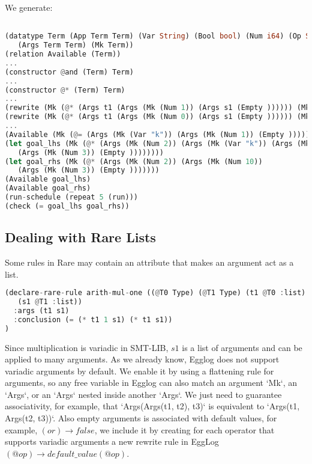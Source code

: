 \documentclass{article}
\begin{document}
We generate:
\begin{lstlisting}[language=Rust]

(datatype Term (App Term Term) (Var String) (Bool bool) (Num i64) (Op String) (Empty)
   (Args Term Term) (Mk Term))
(relation Available (Term))
...
(constructor @and (Term) Term)
...
(constructor @* (Term) Term)
...
(rewrite (Mk (@* (Args t1 (Args (Mk (Num 1)) (Args s1 (Empty )))))) (Mk (@* (Args t1 (Args s1 (Empty ))))))
(rewrite (Mk (@* (Args t1 (Args (Mk (Num 0)) (Args s1 (Empty )))))) (Mk (Num 0)))
...
(Available (Mk (@= (Args (Mk (Var "k")) (Args (Mk (Num 1)) (Empty ))))))
(let goal_lhs (Mk (@* (Args (Mk (Num 2)) (Args (Mk (Var "k")) (Args (Mk (Num 10)) 
   (Args (Mk (Num 3)) (Empty ))))))))
(let goal_rhs (Mk (@* (Args (Mk (Num 2)) (Args (Mk (Num 10))
   (Args (Mk (Num 3)) (Empty )))))))
(Available goal_lhs)
(Available goal_rhs)
(run-schedule (repeat 5 (run)))
(check (= goal_lhs goal_rhs))
\end{lstlisting}

\subsection{Dealing with Rare Lists}
Some rules in Rare may contain an attribute that makes an argument act as a list.
\begin{lstlisting}[language=Rust]
(declare-rare-rule arith-mul-one ((@T0 Type) (@T1 Type) (t1 @T0 :list) 
   (s1 @T1 :list))
  :args (t1 s1)
  :conclusion (= (* t1 1 s1) (* t1 s1))
)
\end{lstlisting}

Since multiplication is variadic in SMT-LIB, $s1$ is a list of arguments and can be applied to many arguments. As we already know, Egglog does not support variadic arguments by default. We enable it by using a flattening rule for arguments, so any free variable in Egglog can also match an argument `Mk`, an `Args`, or an `Args` nested inside another `Args`. We just need to guarantee associativity, for example, that `Args(Args(t1, t2), t3)` is equivalent to `Args(t1, Args(t2, t3))`. Also empty arguments is associated with default values, for example, $(or) \rightarrow false$, we include it by creating for each operator that supports variadic arguments a new rewrite rule in EggLog $(@op) \rightarrow default\_value(@op)$.
\end{document}
